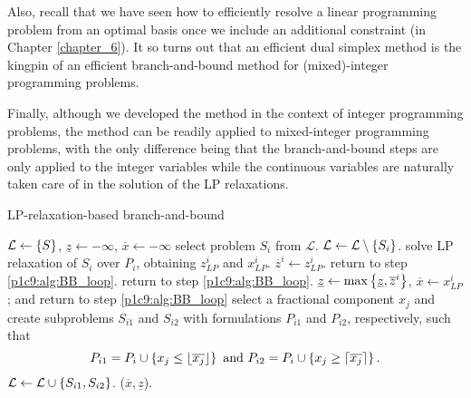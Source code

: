Also, recall that we have seen how to efficiently resolve a linear programming problem from an optimal basis once we include an additional constraint (in Chapter \ref{chapter_6}). It so turns out that an efficient dual simplex method is the kingpin of an efficient branch-and-bound method for (mixed)-integer programming problems.

Finally, although we developed the method in the context of integer programming problems, the method can be readily applied to mixed-integer programming problems, with the only difference being that the branch-and-bound steps are only applied to the integer variables while the continuous variables are naturally taken care of in the solution of the LP relaxations.

\begin{algorithm}[h]
	\caption{LP-relaxation-based branch-and-bound} \label{p1c9:alg:BB}
	\begin{algorithmic}[1] %
		 $\mathcal{L} \gets \left\{ S \right \}$, $\underline{z} \gets -\infty$, $\overline{x} \gets -\infty$
		 \label{p1c9:alg:BB_loop}
		    \State select problem $S_i$ from $\mathcal{L}$. $\mathcal{L} \gets \mathcal{L}\setminus\left\{ S_i \right \}$. 
		    \State solve LP relaxation of $S_i$ over $P_i$, obtaining $z_{LP}^i$ and $x_{LP}^i$. $\overline{z}^i \gets z_{LP}^i$. 
		     return to step \ref{p1c9:alg:BB_loop}.
		     return to step \ref{p1c9:alg:BB_loop}.    
		     $\underline{z} \gets \max\left\{ \underline{z}, \overline{z}^i \right \}$, $\overline{x} \gets x_{LP}^i$; and return to step \ref{p1c9:alg:BB_loop}
		    \EndIf
		    \State select a fractional component $x_j$ and create subproblems $S_{i1}$ and $S_{i2}$ with formulations $P_{i1}$ and $P_{i2}$, respectively, such that 
		    \begin{equation*}
		    		P_{i1} = P_i \cup \left\{ x_j \leq \lfloor \overline{x_j} \rfloor \right \} \text{ and } P_{i2} = P_i \cup \left\{ x_j \geq \lceil \overline{x_j} \rceil \right \}.
		    \end{equation*}
		    \State $\mathcal{L} \gets \mathcal{L} \cup \left\{ S_{i1}, S_{i2} \right \}$.
		\EndWhile
		 ($\overline{x}, \underline{z}$).
	\end{algorithmic}
\end{algorithm}  


